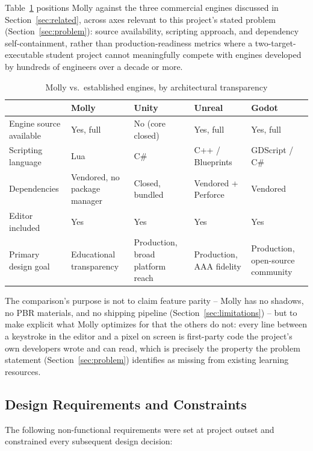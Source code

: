 \documentclass[conference]{IEEEtran}
\begin{document}
Table~\ref{tab:comparison} positions Molly against the three commercial
engines discussed in Section~\ref{sec:related}, across axes relevant to
this project's stated problem (Section~\ref{sec:problem}): source
availability, scripting approach, and dependency self-containment,
rather than production-readiness metrics where a two-target-executable
student project cannot meaningfully compete with engines developed by
hundreds of engineers over a decade or more.

\begin{table}[t]
\caption{Molly vs.\ established engines, by architectural transparency}
\label{tab:comparison}
\centering
\small
\begin{tabular}{lp{3.4cm}p{3.4cm}p{3.4cm}p{3.4cm}}
\toprule
& \textbf{Molly} & \textbf{Unity} & \textbf{Unreal} & \textbf{Godot} \\
\midrule
Engine source available & Yes, full & No (core closed) & Yes, full & Yes, full \\
Scripting language & Lua & C\# & C++ / Blueprints & GDScript / C\# \\
Dependencies & Vendored, no package manager & Closed, bundled & Vendored + Perforce & Vendored \\
Editor included & Yes & Yes & Yes & Yes \\
Primary design goal & Educational transparency & Production, broad platform reach & Production, AAA fidelity & Production, open-source community \\
\bottomrule
\end{tabular}
\end{table}

The comparison's purpose is not to claim feature parity -- Molly has no
shadows, no PBR materials, and no shipping pipeline
(Section~\ref{sec:limitations}) -- but to make explicit what Molly
optimizes for that the others do not: every line between a keystroke in
the editor and a pixel on screen is first-party code the project's own
developers wrote and can read, which is precisely the property the
problem statement (Section~\ref{sec:problem}) identifies as missing from
existing learning resources.

\subsection{Design Requirements and Constraints}
\label{sec:requirements}

The following non-functional requirements were set at project outset and
constrained every subsequent design decision:
\end{document}
